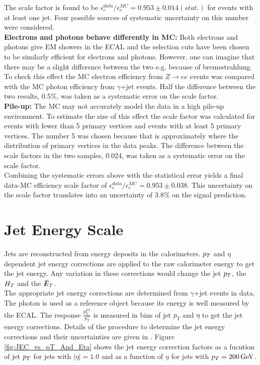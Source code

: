
The scale factor is found to be $\epsilon_{e}^{data}/\epsilon_{e}^{MC} =
0.953\pm 0.014(stat.)$ for events with at least one jet. Four possible sources
of systematic uncertainty on this number were considered. \\

{\bf Electrons and photons behave differently in MC:} Both electrons and photons
give EM showers in the ECAL and the selection cuts have been chosen to be
similarly efficient for electrons and photons. However, one can imagine that
there may be a slight difference between the two e.g. because of bremsstrahlung.
To check this effect the MC electron efficiency from $Z\rightarrow ee$ events
was compared with the MC photon efficiency from $\gamma$+jet events. Half the
difference between the two results, 0.5\unit{\%}, was taken as a systematic 
error on the scale factor. \\

{\bf Pile-up:} The MC may not accurately model the data in a high pile-up
environment. To estimate the size of this effect the scale factor was calculated
for events with fewer than 5 primary vertices and events with at least 5 primary
vertices. The number 5 was chosen because that is approximately where the 
distribution of primary vertices in the data peaks. The difference between the
scale factors in the two samples, 0.024, was taken as a systematic error on the 
scale factor. \\

Combining the systematic errors above with the statistical error yields a final
data-MC efficiency scale factor of $\epsilon_{e}^{data}/\epsilon_{e}^{MC} =
0.953\pm0.038$. This uncertainty on the scale factor translates into an 
uncertainty of 3.8\% on the signal prediction.

\section{Jet Energy Scale}

Jets are reconstructed from energy deposits in the calorimeters. $p_{T}$ and
$\eta$ dependent jet energy corrections are applied to the raw calorimeter 
energy to get the jet energy. Any variation in these corrections would change 
the jet $p_{T}$, the $H_{T}$ and the $\slashed{E}_{T}$. \\

The appropriate jet energy corrections are determined from $\gamma$+jet events
in data. The photon is used as a reference object because its energy is well 
measured by the ECAL. The response $\frac{p_{T}^{jet}}{p_{T}^{\gamma}}$
is measured in bins of jet $p_{T}$ and $\eta$ to get the jet energy corrections. 
Details of the procedure to determine the jet energy corrections and their 
uncertainties are given in \cite{jec}. Figure \ref{fig:JEC_vs_pT_And_Eta} shows 
the jet energy correction factors as a fucntion of jet $p_{T}$ for jets with 
$|\eta| = 1.0$ and as a function of $\eta$ for jets with $p_{T} = 200 \, \mathrm{GeV}$. 
\\

